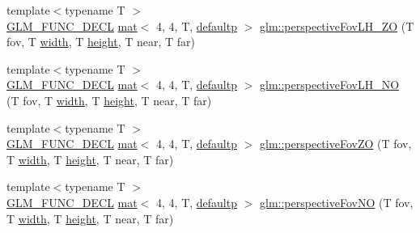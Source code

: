 \begin{DoxyCompactItemize}
\item 
{\footnotesize template$<$typename T $>$ }\\\hyperlink{setup_8hpp_ab2d052de21a70539923e9bcbf6e83a51}{G\+L\+M\+\_\+\+F\+U\+N\+C\+\_\+\+D\+E\+CL} \hyperlink{structglm_1_1mat}{mat}$<$ 4, 4, T, \hyperlink{namespaceglm_a36ed105b07c7746804d7fdc7cc90ff25a9d21ccd8b5a009ec7eb7677befc3bf51}{defaultp} $>$ \hyperlink{group__gtc__matrix__transform_gabdd37014f529e25b2fa1b3ba06c10d5c}{glm\+::perspective\+Fov\+L\+H\+\_\+\+ZO} (T fov, T \hyperlink{_s_d_l__opengl_8h_a9a82cf3caff84cabc4598e2619faac17}{width}, T \hyperlink{_s_d_l__opengl_8h_aa352f2804b9902ac30769c00dde75d5f}{height}, T near, T far)
\item 
{\footnotesize template$<$typename T $>$ }\\\hyperlink{setup_8hpp_ab2d052de21a70539923e9bcbf6e83a51}{G\+L\+M\+\_\+\+F\+U\+N\+C\+\_\+\+D\+E\+CL} \hyperlink{structglm_1_1mat}{mat}$<$ 4, 4, T, \hyperlink{namespaceglm_a36ed105b07c7746804d7fdc7cc90ff25a9d21ccd8b5a009ec7eb7677befc3bf51}{defaultp} $>$ \hyperlink{group__gtc__matrix__transform_gad18a4495b77530317327e8d466488c1a}{glm\+::perspective\+Fov\+L\+H\+\_\+\+NO} (T fov, T \hyperlink{_s_d_l__opengl_8h_a9a82cf3caff84cabc4598e2619faac17}{width}, T \hyperlink{_s_d_l__opengl_8h_aa352f2804b9902ac30769c00dde75d5f}{height}, T near, T far)
\item 
{\footnotesize template$<$typename T $>$ }\\\hyperlink{setup_8hpp_ab2d052de21a70539923e9bcbf6e83a51}{G\+L\+M\+\_\+\+F\+U\+N\+C\+\_\+\+D\+E\+CL} \hyperlink{structglm_1_1mat}{mat}$<$ 4, 4, T, \hyperlink{namespaceglm_a36ed105b07c7746804d7fdc7cc90ff25a9d21ccd8b5a009ec7eb7677befc3bf51}{defaultp} $>$ \hyperlink{group__gtc__matrix__transform_ga4bc69fa1d1f95128430aa3d2a712390b}{glm\+::perspective\+Fov\+ZO} (T fov, T \hyperlink{_s_d_l__opengl_8h_a9a82cf3caff84cabc4598e2619faac17}{width}, T \hyperlink{_s_d_l__opengl_8h_aa352f2804b9902ac30769c00dde75d5f}{height}, T near, T far)
\item 
{\footnotesize template$<$typename T $>$ }\\\hyperlink{setup_8hpp_ab2d052de21a70539923e9bcbf6e83a51}{G\+L\+M\+\_\+\+F\+U\+N\+C\+\_\+\+D\+E\+CL} \hyperlink{structglm_1_1mat}{mat}$<$ 4, 4, T, \hyperlink{namespaceglm_a36ed105b07c7746804d7fdc7cc90ff25a9d21ccd8b5a009ec7eb7677befc3bf51}{defaultp} $>$ \hyperlink{group__gtc__matrix__transform_gaf30e7bd3b1387a6776433dd5383e6633}{glm\+::perspective\+Fov\+NO} (T fov, T \hyperlink{_s_d_l__opengl_8h_a9a82cf3caff84cabc4598e2619faac17}{width}, T \hyperlink{_s_d_l__opengl_8h_aa352f2804b9902ac30769c00dde75d5f}{height}, T near, T far)

\end{DoxyCompactItemize}
